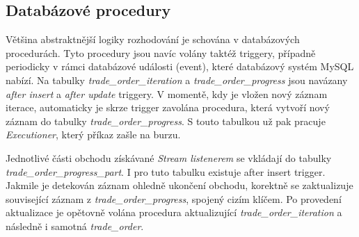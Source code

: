 \subsection{Databázové procedury}
Většina abstraktnější logiky rozhodování je schována v databázových procedurách. Tyto procedury jsou navíc volány taktéž triggery, případně periodicky v rámci databázové události (event), které
databázový systém MySQL nabízí. Na tabulky \emph{trade\_order\_iteration} a \emph{trade\_order\_progress} jsou navázany \emph{after insert} a \emph{after update} triggery. V momentě, kdy je vložen
nový záznam iterace, automaticky je skrze trigger zavolána procedura, která vytvoří nový záznam do tabulky \emph{trade\_order\_progress}. S touto tabulkou už pak pracuje \emph{Executioner}, který
příkaz zašle na burzu.

Jednotlivé části obchodu získávané \emph{Stream listenerem} se vkládají do tabulky \emph{trade\_order\_progress\_part}. I pro tuto tabulku existuje after insert trigger. Jakmile je detekován
záznam ohledně ukončení obchodu, korektně se zaktualizuje související záznam z \emph{trade\_order\_progress}, spojený cizím klíčem. Po provedení aktualizace je opětovně volána procedura aktualizující
\emph{trade\_order\_iteration} a následně i samotná \emph{trade\_order}.

\endinput